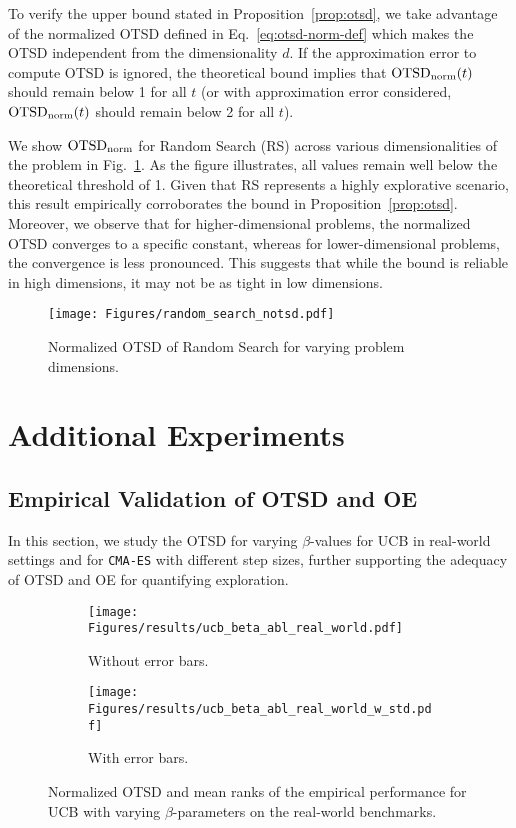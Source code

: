 \documentclass[accepted]{uai2025}
\begin{document}
To verify the upper bound stated in Proposition~\ref{prop:otsd}, we take advantage of the normalized OTSD defined in Eq.~\eqref{eq:otsd-norm-def} which makes the OTSD independent from the dimensionality $d$. If the approximation error to compute OTSD is ignored, the theoretical bound implies that $\textup{OTSD}_{\text{norm}}(t)$ should remain below 1 for all $t$ (or with approximation error considered, $\textup{OTSD}_{\text{norm}}(t)$ should remain below 2 for all $t$).

We show $\textup{OTSD}_{\text{norm}}$ for Random Search (\ac{RS}) across various dimensionalities of the problem in Fig.~\ref{fig:rs_otsd}.
As the figure illustrates, all values remain well below the theoretical threshold of 1. Given that \ac{RS} represents a highly explorative scenario, this result empirically corroborates the bound in Proposition~\ref{prop:otsd}. Moreover, we observe that for higher-dimensional problems, the normalized OTSD converges to a specific constant, whereas for lower-dimensional problems, the convergence is less pronounced. 
This suggests that while the bound is reliable in high dimensions, it may not be as tight in low dimensions.
\begin{figure}[htb]
    \centering
    \texttt{[image: Figures/random\_search\_notsd.pdf]}
    \caption{Normalized OTSD of Random Search for varying problem dimensions.}
    \label{fig:rs_otsd}
\end{figure}


\section{Additional Experiments}
\label{app:benchmark-overview}

\subsection{Empirical Validation of OTSD and OE}
\label{app:empirical_validation_otsd_and_oe}

In this section, we study the \ac{OTSD} for varying $\beta$-values for \ac{UCB} in real-world settings and for \texttt{CMA-ES} with different step sizes, further supporting the adequacy of \ac{OTSD} and \ac{OE} for quantifying exploration.

\begin{figure}[H]
    \centering
    \begin{subfigure}{0.48\linewidth}
    \texttt{[image: Figures/results/ucb\_beta\_abl\_real\_world.pdf]}
    \caption{Without error bars.}
    \end{subfigure}
    \begin{subfigure}{0.48\linewidth}
    \texttt{[image: Figures/results/ucb\_beta\_abl\_real\_world\_w\_std.pdf]}
    \caption{With error bars.}
    \end{subfigure}
    \caption{Normalized OTSD and mean ranks of the empirical performance for \ac{UCB} with varying $\beta$-parameters on the real-world benchmarks.}
    \label{fig:abl_ucb_rw}
\end{figure}
\end{document}
